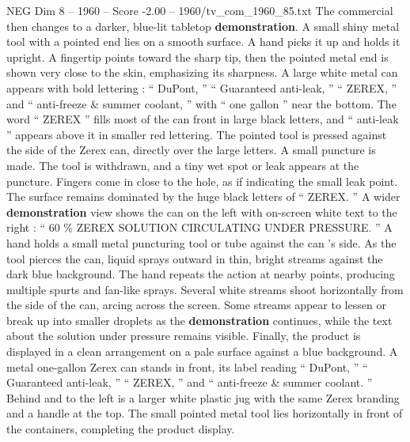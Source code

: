 \begin{textsample}{NEG Dim 8 – 1960 – Score -2.00 – 1960/tv\_com\_1960\_85.txt}
The commercial then changes to a darker, blue-lit tabletop \textbf{demonstration}.
A small shiny metal tool with a pointed end lies on a smooth surface.
A hand picks it up and holds it upright.
A fingertip points toward the sharp tip, then the pointed metal end is shown very close to the skin, emphasizing its sharpness.
A large white metal can appears with bold lettering : “ DuPont, ” “ Guaranteed anti-leak, ” “ ZEREX, ” and “ anti-freeze \& summer coolant, ” with “ one gallon ” near the bottom.
The word “ ZEREX ” fills most of the can front in large black letters, and “ anti-leak ” appears above it in smaller red lettering.
The pointed tool is pressed against the side of the Zerex can, directly over the large letters.
A small puncture is made.
The tool is withdrawn, and a tiny wet spot or leak appears at the puncture.
Fingers come in close to the hole, as if indicating the small leak point.
The surface remains dominated by the huge black letters of “ ZEREX. ” A wider \textbf{demonstration} view shows the can on the left with on-screen white text to the right : “ 60 \% ZEREX SOLUTION CIRCULATING UNDER PRESSURE. ” A hand holds a small metal puncturing tool or tube against the can ’s side.
As the tool pierces the can, liquid sprays outward in thin, bright streams against the dark blue background.
The hand repeats the action at nearby points, producing multiple spurts and fan-like sprays.
Several white streams shoot horizontally from the side of the can, arcing across the screen.
Some streams appear to lessen or break up into smaller droplets as the \textbf{demonstration} continues, while the text about the solution under pressure remains visible.
Finally, the product is displayed in a clean arrangement on a pale surface against a blue background.
A metal one-gallon Zerex can stands in front, its label reading “ DuPont, ” “ Guaranteed anti-leak, ” “ ZEREX, ” and “ anti-freeze \& summer coolant. ” Behind and to the left is a larger white plastic jug with the same Zerex branding and a handle at the top.
The small pointed metal tool lies horizontally in front of the containers, completing the product display.

\end{textsample}
